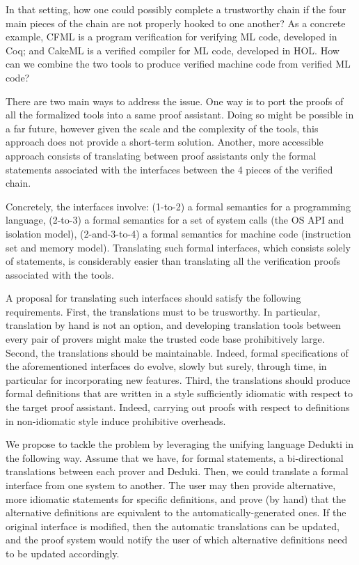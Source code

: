 \begin{workpackage}[id=libraries,wphases=0-48,type=RTD,
  short=Libraries,%
  title=Libraries,
  lead=Inr,
  InrRM=10,
  TumRM=24]
In that setting, how one could possibly complete a trustworthy chain if
the four main pieces of the chain are not properly hooked to one another?
As a concrete example, CFML is a program verification for verifying ML code,
developed in Coq; and CakeML is a verified compiler for ML code,
developed in HOL. How can we combine the two tools to produce verified
machine code from verified ML code?

There are two main ways to address the issue. One way is to port the
proofs of all the formalized tools into a same proof assistant.
Doing so might be possible in a far future, however given the scale and
the complexity of the tools, this approach does not provide a short-term
solution. Another, more accessible approach consists of translating
between proof assistants only the formal statements associated with the
interfaces between the 4 pieces of the verified chain.

Concretely, the interfaces involve: (1-to-2) a formal semantics for
a programming language, (2-to-3) a formal semantics for a set of
system calls (the OS API and isolation model), (2-and-3-to-4) a formal
semantics for machine code (instruction set and memory model).
Translating such formal interfaces, which consists solely of statements,
is considerably easier than translating all the verification proofs
associated with the tools.

A proposal for translating such interfaces should satisfy the following
requirements. First, the translations must to be trusworthy. In particular,
translation by hand is not an option, and developing translation tools
between every pair of provers might make the trusted code base prohibitively
large. Second, the translations should be maintainable. Indeed,
formal specifications of the aforementioned interfaces do evolve, slowly but
surely, through time, in particular for incorporating new features.
Third, the translations should produce formal definitions that are written
in a style sufficiently idiomatic with respect to the target proof assistant.
Indeed, carrying out proofs with respect to definitions in non-idiomatic
style induce prohibitive overheads.

We propose to tackle the problem by leveraging the unifying language
Dedukti in the following way. Assume that we have, for formal statements,
a bi-directional translations between each prover and Deduki. Then,
we could translate a formal interface from one system to another.
The user may then provide alternative, more idiomatic statements for
specific definitions, and prove (by hand) that the alternative definitions
are equivalent to the automatically-generated ones. If the original
interface is modified, then the automatic translations can be updated,
and the proof system would notify the user of which alternative definitions
need to be updated accordingly.


\end{workpackage}
